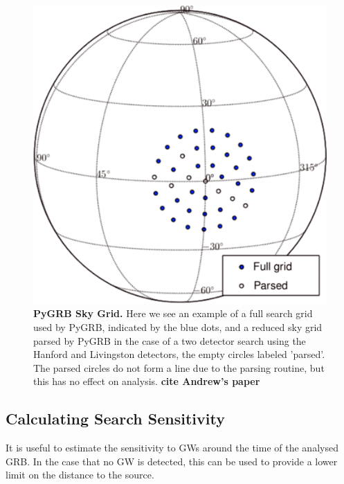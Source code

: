 \documentclass[11pt]{cuthesis}
\begin{document}
\begin{figure} %
\begin{center}
\includegraphics[width=0.6\linewidth]{skypatch.png}
\end{center}
\caption{\textbf{PyGRB Sky Grid.} Here we see an example of a full search grid used by PyGRB, indicated by the blue dots, and a reduced sky grid parsed by PyGRB in the case of a two detector search using the Hanford and Livingston detectors, the empty circles labeled 'parsed'. The parsed circles do not form a line due to the parsing routine, but this has no effect on analysis. \textbf{cite Andrew's paper}}
\label{fig:skypatch}
\end{figure}

\subsection{Calculating Search Sensitivity} \label{sec:pygrb sensitivity}
It is useful to estimate the sensitivity to GWs around the time of the analysed GRB. In the case that no GW is detected, this can be used to provide a lower limit on the distance to the source.  
\end{document}
